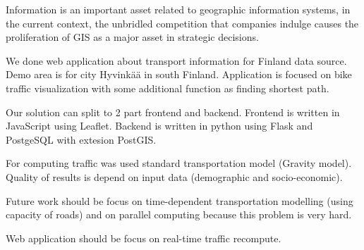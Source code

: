 

Information is an important asset related to geographic information systems, in the current context, the unbridled competition that companies indulge causes the proliferation of GIS as a major asset in strategic decisions.

We done web application about transport information for Finland data source. Demo area is for city Hyvinkää in south Finland. Application is focused on bike traffic visualization with some additional function as finding shortest path.

Our solution can split to 2 part frontend and backend. Frontend is written in JavaScript using Leaflet. Backend is written in python using Flask and PostgeSQL with extesion PostGIS.

For computing traffic was used standard transportation model (Gravity model). Quality of results is depend on input data (demographic and socio-economic).

Future work should be focus on time-dependent transportation modelling (using capacity of roads) and on parallel computing because this problem is very hard.

Web application should be focus on real-time traffic recompute.










